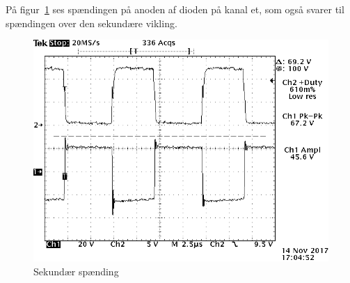 På figur~\ref{fig:sek} ses spændingen på anoden af dioden på kanal et, som også svarer til spændingen over den sekundære vikling.
\begin{figure}[H]
	\center
	\includegraphics[max width=0.7\linewidth]{../dokumentation/tex/2iteration/billeder/Realisering/Transformator_sekundar.png}
	\caption{Sekundær spænding}
	\label{fig:sek}
\end{figure}